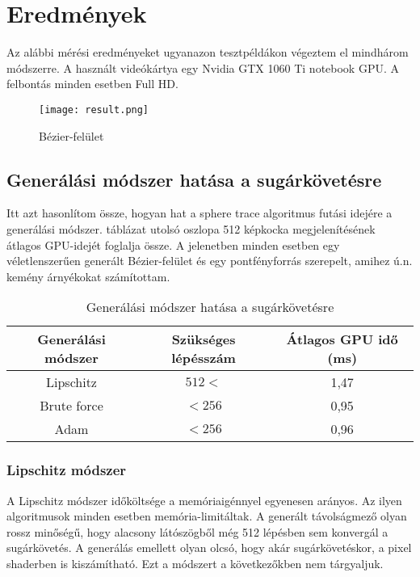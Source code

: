 \chapter{Eredmények}

Az alábbi mérési eredményeket ugyanazon tesztpéldákon végeztem el mindhárom módszerre. A használt videókártya egy Nvidia GTX 1060 Ti notebook GPU. A felbontás minden esetben Full HD.

\begin{figure}[H]
	\centering
	\texttt{[image: result.png]}
	\caption{Bézier-felület}
	\label{img:bezSurf}
\end{figure}

\section{Generálási módszer hatása a sugárkövetésre}

Itt azt hasonlítom össze, hogyan hat a sphere trace algoritmus futási idejére a generálási módszer.  táblázat utolsó oszlopa 512 képkocka megjelenítésének átlagos GPU-idejét foglalja össze. A jelenetben minden esetben egy véletlenszerűen generált Bézier-felület és egy pontfényforrás szerepelt, amihez ú.n. kemény árnyékokat számítottam.

\begin{table}[H]
	\begin{center}
		\begin{tabular}{| c || c | c |}
			\hline
			\textbf{Generálási módszer} & \textbf{Szükséges lépésszám} & \textbf{Átlagos GPU idő (ms)} \\ 
			\hline\hline
			Lipschitz & $512<$ & 1,47 \\
			\hline
			Brute force & $<256$ & 0,95 \\
			\hline
			Adam & $<256$ & 0,96 \\
			\hline
		\end{tabular}
	\end{center}
	\caption{Generálási módszer hatása a sugárkövetésre}
	\label{tab:trace}
\end{table}

\subsection{Lipschitz módszer}
A Lipschitz módszer időköltsége a memóriaigénnyel egyenesen arányos. Az ilyen algoritmusok minden esetben memória-limitáltak. A generált távolságmező olyan rossz minőségű, hogy alacsony látószögből még 512 lépésben sem konvergál a sugárkövetés. A generálás emellett olyan olcsó, hogy akár sugárkövetéskor, a pixel shaderben is kiszámítható. Ezt a módszert a következőkben nem tárgyaljuk.

